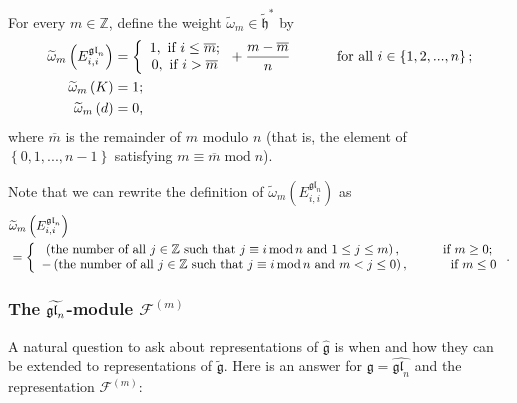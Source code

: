 \documentclass[etingof-lie.tex]{subfiles}
\begin{document}
\begin{definition}
For every $m\in\mathbb{Z}$, define the weight $\widetilde{\omega}_{m}%
\in\widetilde{\mathfrak{h}}^{\ast}$ by%
\begin{align*}
\widetilde{\omega}_{m}\left(  E_{i,i}^{\mathfrak{gl}_{n}}\right)   &
=\left\{
\begin{array}
[c]{c}%
1,\text{ if }i\leq\overline{m};\\
0,\text{ if }i>\overline{m}%
\end{array}
\right.  +\dfrac{m-\overline{m}}{n}\ \ \ \ \ \ \ \ \ \ \text{for all }%
i\in\left\{  1,2,...,n\right\}  ;\\
\widetilde{\omega}_{m}\left(  K\right)   &  =1;\\
\widetilde{\omega}_{m}\left(  d\right)   &  =0,
\end{align*}
where $\overline{m}$ is the remainder of $m$ modulo $n$ (that is, the element
of $\left\{  0,1,...,n-1\right\}  $ satisfying $m\equiv\overline
{m}\operatorname{mod}n$).
\end{definition}

Note that we can rewrite the definition of $\widetilde{\omega}_{m}\left(
E_{i,i}^{\mathfrak{gl}_{n}}\right)  $ as%
\begin{align*}
&  \widetilde{\omega}_{m}\left(  E_{i,i}^{\mathfrak{gl}_{n}}\right) \\
&  =\left\{
\begin{array}
[c]{c}%
\left(  \text{the number of all }j\in\mathbb{Z}\text{ such that }j\equiv
i\operatorname{mod}n\text{ and }1\leq j\leq m\right)
,\ \ \ \ \ \ \ \ \ \ \text{if }m\geq0;\\
-\left(  \text{the number of all }j\in\mathbb{Z}\text{ such that }j\equiv
i\operatorname{mod}n\text{ and }m<j\leq0\right)  ,\ \ \ \ \ \ \ \ \ \ \text{if
}m\leq0
\end{array}
\right.  .
\end{align*}


\subsubsection{The \texorpdfstring{$\protect\widetilde{\mathfrak{gl}_{n}}$}
{gl-n-tilde}-module
\texorpdfstring{$\mathcal{F}^{\left(  m\right)  }$}{structure on the
semi-infinite wedge space}}

A natural question to ask about representations of $\widehat{\mathfrak{g}}$ is
when and how they can be extended to representations of
$\widetilde{\mathfrak{g}}$. Here is an answer for $\mathfrak{g}%
=\widehat{\mathfrak{gl}_{n}}$ and the representation $\mathcal{F}^{\left(
m\right)  }$:
\end{document}
